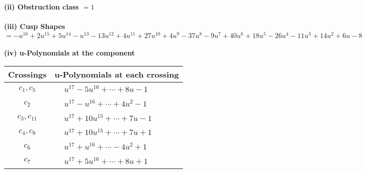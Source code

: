 \documentclass[1p]{elsarticle_modified}
\theoremstyle{definition}
\begin{document}
\flushleft \textbf{(ii) Obstruction class $= 1$}\\~\\
\flushleft \textbf{(iii) Cusp Shapes $= - u^{16}+2 u^{15}+5 u^{14}- u^{13}-13 u^{12}+4 u^{11}+27 u^{10}+4 u^9-37 u^8-9 u^7+40 u^6+18 u^5-26 u^4-11 u^3+14 u^2+6 u-8$}\\~\\
\newpage\renewcommand{\arraystretch}{1}
\flushleft \textbf{(iv) u-Polynomials at the component}\newline \\
\begin{tabular}{m{50pt}|m{274pt}}
Crossings & \hspace{64pt}u-Polynomials at each crossing \\
\hline $$\begin{aligned}c_{1},c_{5}\end{aligned}$$&$\begin{aligned}
&u^{17}-5 u^{16}+\cdots+8 u-1
\end{aligned}$\\
\hline $$\begin{aligned}c_{2}\end{aligned}$$&$\begin{aligned}
&u^{17}- u^{16}+\cdots+4 u^2-1
\end{aligned}$\\
\hline $$\begin{aligned}c_{3},c_{11}\end{aligned}$$&$\begin{aligned}
&u^{17}+10 u^{15}+\cdots+7 u-1
\end{aligned}$\\
\hline $$\begin{aligned}c_{4},c_{9}\end{aligned}$$&$\begin{aligned}
&u^{17}+10 u^{15}+\cdots+7 u+1
\end{aligned}$\\
\hline $$\begin{aligned}c_{6}\end{aligned}$$&$\begin{aligned}
&u^{17}+u^{16}+\cdots-4 u^2+1
\end{aligned}$\\
\hline $$\begin{aligned}c_{7}\end{aligned}$$&$\begin{aligned}
&u^{17}+5 u^{16}+\cdots+8 u+1
\end{aligned}$\\

\end{tabular}
\end{document}
